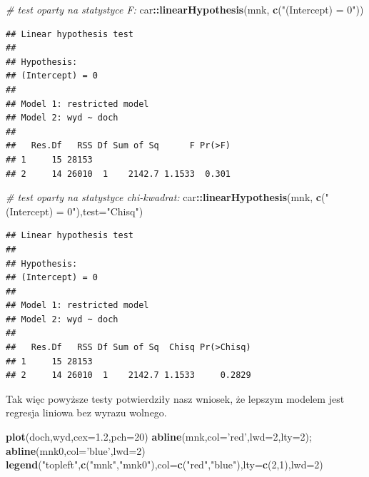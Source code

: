 \documentclass[polish,]{book}
\newenvironment{Shaded}{\begin{snugshade}}{\end{snugshade}}
\newcommand{\CommentTok}[1]{\textcolor[rgb]{0.56,0.35,0.01}{\textit{#1}}}
\newcommand{\DataTypeTok}[1]{\textcolor[rgb]{0.13,0.29,0.53}{#1}}
\newcommand{\DecValTok}[1]{\textcolor[rgb]{0.00,0.00,0.81}{#1}}
\newcommand{\FloatTok}[1]{\textcolor[rgb]{0.00,0.00,0.81}{#1}}
\newcommand{\KeywordTok}[1]{\textcolor[rgb]{0.13,0.29,0.53}{\textbf{#1}}}
\newcommand{\NormalTok}[1]{#1}
\newcommand{\OperatorTok}[1]{\textcolor[rgb]{0.81,0.36,0.00}{\textbf{#1}}}
\newcommand{\StringTok}[1]{\textcolor[rgb]{0.31,0.60,0.02}{#1}}
\begin{document}
\begin{Shaded}
\begin{Highlighting}[]
\CommentTok{# test oparty na statystyce F:}
\NormalTok{car}\OperatorTok{::}\KeywordTok{linearHypothesis}\NormalTok{(mnk, }\KeywordTok{c}\NormalTok{(}\StringTok{"(Intercept) = 0"}\NormalTok{))}
\end{Highlighting}
\end{Shaded}

\begin{verbatim}
## Linear hypothesis test
## 
## Hypothesis:
## (Intercept) = 0
## 
## Model 1: restricted model
## Model 2: wyd ~ doch
## 
##   Res.Df   RSS Df Sum of Sq      F Pr(>F)
## 1     15 28153                           
## 2     14 26010  1    2142.7 1.1533  0.301
\end{verbatim}

\begin{Shaded}
\begin{Highlighting}[]
\CommentTok{# test oparty na statystyce chi-kwadrat:}
\NormalTok{car}\OperatorTok{::}\KeywordTok{linearHypothesis}\NormalTok{(mnk, }\KeywordTok{c}\NormalTok{(}\StringTok{"(Intercept) = 0"}\NormalTok{),}\DataTypeTok{test=}\StringTok{"Chisq"}\NormalTok{)}
\end{Highlighting}
\end{Shaded}

\begin{verbatim}
## Linear hypothesis test
## 
## Hypothesis:
## (Intercept) = 0
## 
## Model 1: restricted model
## Model 2: wyd ~ doch
## 
##   Res.Df   RSS Df Sum of Sq  Chisq Pr(>Chisq)
## 1     15 28153                               
## 2     14 26010  1    2142.7 1.1533     0.2829
\end{verbatim}

Tak więc powyższe testy potwierdziły nasz wniosek, że lepszym modelem jest regresja liniowa bez wyrazu wolnego.

\begin{Shaded}
\begin{Highlighting}[]
\KeywordTok{plot}\NormalTok{(doch,wyd,}\DataTypeTok{cex=}\FloatTok{1.2}\NormalTok{,}\DataTypeTok{pch=}\DecValTok{20}\NormalTok{)}
\KeywordTok{abline}\NormalTok{(mnk,}\DataTypeTok{col=}\StringTok{'red'}\NormalTok{,}\DataTypeTok{lwd=}\DecValTok{2}\NormalTok{,}\DataTypeTok{lty=}\DecValTok{2}\NormalTok{); }\KeywordTok{abline}\NormalTok{(mnk0,}\DataTypeTok{col=}\StringTok{'blue'}\NormalTok{,}\DataTypeTok{lwd=}\DecValTok{2}\NormalTok{)}
\KeywordTok{legend}\NormalTok{(}\StringTok{"topleft"}\NormalTok{,}\KeywordTok{c}\NormalTok{(}\StringTok{"mnk"}\NormalTok{,}\StringTok{"mnk0"}\NormalTok{),}\DataTypeTok{col=}\KeywordTok{c}\NormalTok{(}\StringTok{"red"}\NormalTok{,}\StringTok{"blue"}\NormalTok{),}\DataTypeTok{lty=}\KeywordTok{c}\NormalTok{(}\DecValTok{2}\NormalTok{,}\DecValTok{1}\NormalTok{),}\DataTypeTok{lwd=}\DecValTok{2}\NormalTok{)}
\end{Highlighting}
\end{Shaded}
\end{document}
